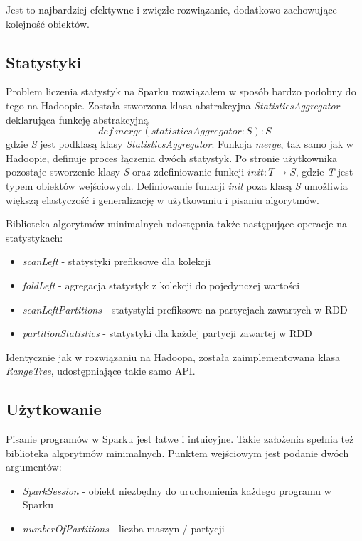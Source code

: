 \documentclass{pracamgr}
\begin{document}
Jest to najbardziej efektywne i zwięzłe rozwiązanie, dodatkowo zachowujące kolejność obiektów. 

\subsection{Statystyki}

Problem liczenia statystyk na Sparku rozwiązałem w sposób bardzo podobny do tego na Hadoopie. Została stworzona klasa abstrakcyjna \textit{StatisticsAggregator} deklarująca funkcję abstrakcyjną
$$def \ merge(statisticsAggregator: S): S $$ gdzie \textit{S} jest podklasą klasy \textit{StatisticsAggregator}. Funkcja \textit{merge}, tak samo jak w Hadoopie, definuje proces łączenia dwóch statystyk. Po stronie użytkownika pozostaje stworzenie klasy \textit{S} oraz zdefiniowanie funkcji $init: T \rightarrow S$, gdzie \textit{T} jest typem obiektów wejściowych. Definiowanie funkcji \textit{init} poza klasą \textit{S} umożliwia większą elastyczość i generalizację w użytkowaniu i pisaniu algorytmów.

Biblioteka algorytmów minimalnych udostępnia także następujące operacje na statystykach:
\begin{itemize}
    \item \textit{scanLeft} - statystyki prefiksowe dla kolekcji
    \item \textit{foldLeft} - agregacja statystyk z kolekcji do pojedynczej wartości
    \item \textit{scanLeftPartitions} - statystyki prefiksowe na partycjach zawartych w RDD
    \item \textit{partitionStatistics} - statystyki dla każdej partycji zawartej w RDD
\end{itemize}

Identycznie jak w rozwiązaniu na Hadoopa, została zaimplementowana klasa \textit{RangeTree}, udostępniające takie samo API.

\subsection{Użytkowanie}

Pisanie programów w Sparku jest łatwe i intuicyjne. Takie założenia spełnia też biblioteka algorytmów minimalnych. Punktem wejściowym jest podanie dwóch argumentów:
\begin{itemize}
    \item \textit{SparkSession} - obiekt niezbędny do uruchomienia każdego programu w Sparku
    \item \textit{numberOfPartitions} - liczba maszyn / partycji
\end{itemize}
\end{document}
